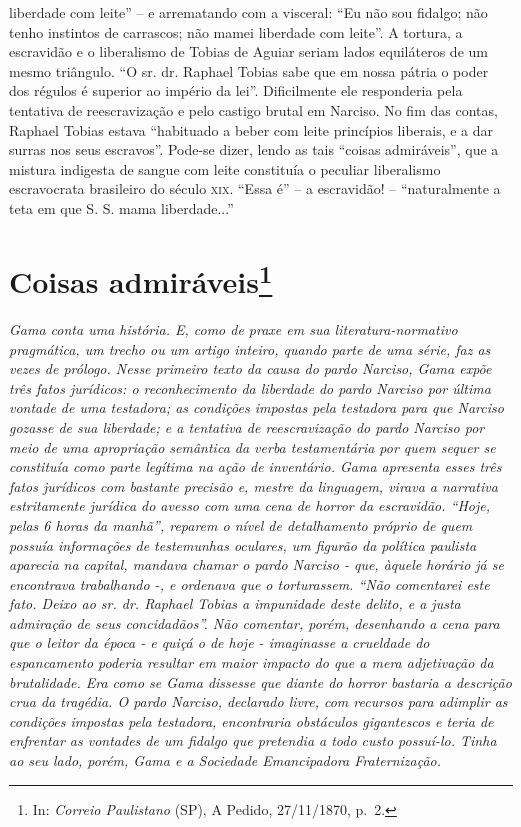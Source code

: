 {\begin{didascalia}
{liberdade com leite'' -- e arrematando com a visceral: ``Eu não sou
fidalgo; não tenho instintos de carrascos; não mamei liberdade com
leite''. A tortura, a escravidão e o liberalismo de Tobias de Aguiar
seriam lados equiláteros de um mesmo triângulo. ``O sr. dr. Raphael
Tobias sabe que em nossa pátria o poder dos régulos é superior ao
império da lei''. Dificilmente ele responderia pela tentativa de
reescravização e pelo castigo brutal em Narciso. No fim das contas,
Raphael Tobias estava ``habituado a beber com leite princípios liberais,
e a dar surras nos seus escravos''. Pode-se dizer, lendo as tais ``coisas
admiráveis'', que a mistura indigesta de sangue com leite constituía o
peculiar liberalismo escravocrata brasileiro do século \textsc{xix}. ``Essa é'' --
a escravidão! -- ``naturalmente a teta em que S. S. mama liberdade...''}
\end{didascalia}

\chapter{Coisas admiráveis\footnote{ In: \emph{Correio Paulistano} (SP), A Pedido, 27/11/1870,
  p.~2.}} %

\begin{didascalia}
\emph{Gama conta uma história. E, como de praxe em sua
literatura-normativo pragmática, um trecho ou um artigo inteiro, quando
parte de uma série, faz as vezes de prólogo. Nesse primeiro texto da
causa do pardo Narciso, Gama expõe três fatos jurídicos: o
reconhecimento da liberdade do pardo Narciso por última vontade de uma
testadora; as condições impostas pela testadora para que Narciso gozasse
de sua liberdade; e a tentativa de reescravização do pardo Narciso por
meio de uma apropriação semântica da verba testamentária por quem sequer
se constituía como parte legítima na ação de inventário. Gama apresenta
esses três fatos jurídicos com bastante precisão e, mestre da linguagem,
virava a narrativa estritamente jurídica do avesso com uma cena de
horror da escravidão. ``Hoje, pelas 6 horas da manhã'', reparem o nível de
detalhamento próprio de quem possuía informações de testemunhas
oculares, um figurão da política paulista aparecia na capital, mandava
chamar o pardo Narciso - que, àquele horário já se encontrava
trabalhando -, e ordenava que o torturassem. ``Não comentarei este fato.
Deixo ao sr. dr. Raphael Tobias a impunidade deste delito, e a justa
admiração de seus concidadãos''. Não comentar, porém, desenhando a cena
para que o leitor da época - e quiçá o de hoje - imaginasse a crueldade
do espancamento poderia resultar em maior impacto do que a mera
adjetivação da brutalidade. Era como se Gama dissesse que diante do
horror bastaria a descrição crua da tragédia. O pardo Narciso, declarado
livre, com recursos para adimplir as condições impostas pela testadora,
encontraria obstáculos gigantescos e teria de enfrentar as vontades de
um fidalgo que pretendia a todo custo possuí-lo. Tinha ao seu lado,
porém, Gama e a Sociedade Emancipadora Fraternização.}
\end{didascalia}

}

